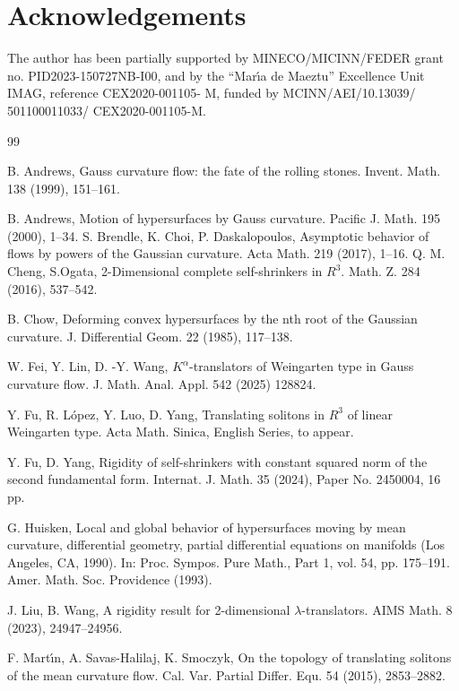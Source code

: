 \documentclass[a4paper,12pt]{amsart}
\theoremstyle{definition}
\begin{document}
\section*{Acknowledgements}
The author  has been partially supported by MINECO/MICINN/FEDER grant no. PID2023-150727NB-I00,  and by the ``Mar\'{\i}a de Maeztu'' Excellence Unit IMAG, reference CEX2020-001105- M, funded by MCINN/AEI/10.13039/ 501100011033/ CEX2020-001105-M.
\begin{thebibliography}{99}
 
  B. Andrews,   Gauss curvature flow: the fate of the rolling stones. Invent. Math. 138 (1999), 151--161.
 
  B. Andrews, Motion of hypersurfaces by Gauss curvature. Pacific J. Math. 195 (2000), 1--34.
   S. Brendle, K. Choi, P. Daskalopoulos,   Asymptotic behavior of flows by powers of the Gaussian curvature. Acta Math. 219  (2017), 1--16.
  Q. M. Cheng, S.Ogata,  2-Dimensional complete self-shrinkers in $R^3$. Math. Z. 284 (2016), 537--542.
 
  B. Chow, Deforming convex hypersurfaces by the nth root of the Gaussian curvature. J. Differential Geom. 22 (1985), 117--138.
 
 W. Fei, Y. Lin, D. -Y. Wang, $K^\alpha$-translators of Weingarten type in Gauss curvature flow. J. Math. Anal. Appl. 542 (2025) 128824.
 
 
 Y. Fu, R. L\'opez, Y. Luo, D. Yang, Translating solitons in $R^3$ of linear Weingarten type. Acta Math. Sinica, English Series, to appear. 


 
 Y. Fu, D. Yang, Rigidity of self-shrinkers with constant squared norm of the second fundamental form.  
Internat. J. Math. 35 (2024),   Paper No. 2450004, 16 pp.

 G. Huisken,  Local and global behavior of hypersurfaces moving by mean curvature, differential geometry, partial differential equations on manifolds (Los Angeles, CA, 1990). In: Proc. Sympos. Pure Math., Part 1, vol. 54, pp. 175--191. Amer. Math. Soc. Providence (1993).

 J. Liu, B. Wang, A rigidity result for 2-dimensional $\lambda$-translators.  AIMS Math. 8 (2023),   24947--24956.


 F. Mart\'{\i}n, A. Savas-Halilaj, K. Smoczyk, On the topology of translating solitons of the mean curvature flow. Cal. Var. Partial Differ. Equ. 54 (2015), 2853--2882.


\end{thebibliography}
\end{document}
